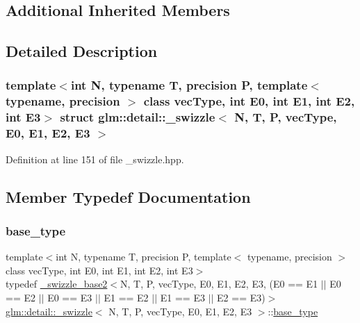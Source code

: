 \subsection*{Additional Inherited Members}


\subsection{Detailed Description}
\subsubsection*{template$<$int N, typename T, precision P, template$<$ typename, precision $>$ class vec\+Type, int E0, int E1, int E2, int E3$>$\newline
struct glm\+::detail\+::\+\_\+swizzle$<$ N, T, P, vec\+Type, E0, E1, E2, E3 $>$}



Definition at line 151 of file \+\_\+swizzle.\+hpp.



\subsection{Member Typedef Documentation}
\mbox{\label{structglm_1_1detail_1_1__swizzle_a38e9744c2fa9929a0c847c52d1832ce6}} 
\subsubsection{\texorpdfstring{base\_type}{base\_type}}
{\footnotesize\ttfamily template$<$int N, typename T, precision P, template$<$ typename, precision $>$ class vec\+Type, int E0, int E1, int E2, int E3$>$ \\
typedef \mbox{\hyperlink{structglm_1_1detail_1_1__swizzle__base2}{\+\_\+swizzle\+\_\+base2}}$<$N, T, P, vec\+Type, E0, E1, E2, E3, (E0 == E1 $\vert$$\vert$ E0 == E2 $\vert$$\vert$ E0 == E3 $\vert$$\vert$ E1 == E2 $\vert$$\vert$ E1 == E3 $\vert$$\vert$ E2 == E3)$>$ \mbox{\hyperlink{structglm_1_1detail_1_1__swizzle}{glm\+::detail\+::\+\_\+swizzle}}$<$ N, T, P, vec\+Type, E0, E1, E2, E3 $>$\+::\mbox{\hyperlink{structglm_1_1detail_1_1__swizzle_a38e9744c2fa9929a0c847c52d1832ce6}{base\+\_\+type}}}



